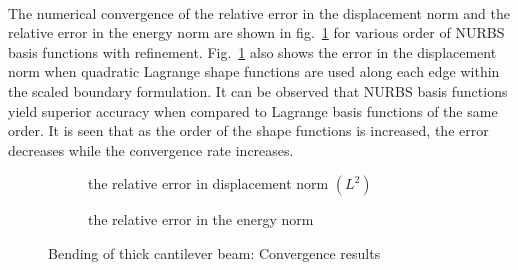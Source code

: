 \paragraph{}
The numerical convergence of the relative error in the displacement norm and the relative error in the energy norm are
    shown in fig.~\ref{fig:cantilever_beam_convergence} for various order of NURBS basis functions with refinement.
Fig.~\ref{fig:cantilever_beam_convergence} also shows the error in the displacement norm when quadratic Lagrange shape
    functions are used along each edge within the scaled boundary formulation.
It can be observed that NURBS basis functions yield superior accuracy when compared to Lagrange basis functions of the
    same order.
It is seen that as the order of the shape functions is increased, the error decreases while the convergence rate increases.

\begin{figure}
    \begin{subfigure}[b]{1\linewidth}
        \centering
        \scalebox{0.7}{
            
        }
        \caption{the relative error in displacement norm $(L^2)$}
    \end{subfigure}
    
    \begin{subfigure}[b]{1\linewidth}
        \centering
        \scalebox{0.7}{
            
        }
        \caption{the relative error in the energy norm}
    \end{subfigure}
\label{fig:cantilever_beam_convergence}
\caption{Bending of thick cantilever beam: Convergence results}
\end{figure}
\pagebreak